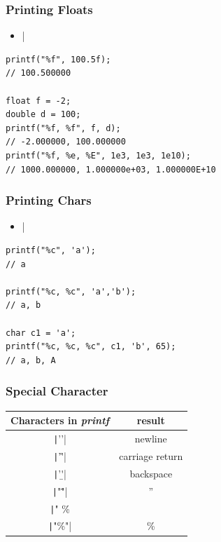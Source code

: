 \documentclass{../c-lecture}
\begin{document}
\begin{frame}[fragile]
  \frametitle{Printing Floats}
  \begin{itemize}
    \item {}|%
  \end{itemize}
  \begin{verbatim}
printf("%f", 100.5f);
// 100.500000

float f = -2;
double d = 100;
printf("%f, %f", f, d);
// -2.000000, 100.000000
printf("%f, %e, %E", 1e3, 1e3, 1e10);
// 1000.000000, 1.000000e+03, 1.000000E+10
  \end{verbatim}
\end{frame}

\begin{frame}[fragile]
  \frametitle{Printing Chars}
  \begin{itemize}
    \item {}|%
  \end{itemize}
  \begin{verbatim}
printf("%c", 'a');
// a

printf("%c, %c", 'a','b');
// a, b

char c1 = 'a';
printf("%c, %c, %c", c1, 'b', 65);
// a, b, A
  \end{verbatim}
\end{frame}

\begin{frame}[fragile]
  \frametitle{Special Character}
  \begin{table}
  \begin{tabular}{cc}
    \toprule

    Characters in \textit{\color{Orange} printf} &
    result \\

    \midrule

    \texttt|'\n'| &
    newline \\

    \midrule

    \texttt|'\r'| &
    carriage return \\

    \midrule

    \texttt|'\b'| &
    backspace \\

    \midrule

    \texttt|"\""| &
    '' \\

    \midrule

    \texttt|"%
    \% \\

    \midrule

    \texttt|"\%"| &
    \% \\

    \bottomrule
  \end{tabular}
  \end{table}
\end{frame}
\end{document}
